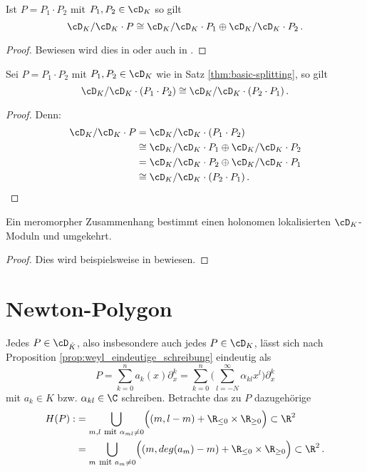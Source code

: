 \begin{thm}\label{thm:basic-splitting}
Ist $P=P_1\cdot P_2$ mit $P_1,P_2\in \cD_K$ so gilt
\[
\cD_K/\cD_K\cdot P \cong \cD_K/\cD_K\cdot P_1 \oplus \cD_K/\cD_K\cdot P_2 \,.
\]
\end{thm}
\begin{proof}
Bewiesen wird dies in
\cite[Seite 57-64]{ZulaBarbara}
oder auch in \cite[Seite 30-32]{sabbah_cimpa90}.
\end{proof}
\begin{cor} \label{cor:moduluKomutativität}
Sei $P=P_1\cdot P_2$ mit $P_1,P_2\in \cD_K$ wie in Satz
\ref{thm:basic-splitting}, so gilt
\[
\cD_K/\cD_K\cdot (P_1\cdot P_2) \cong \cD_K/\cD_K\cdot (P_2 \cdot P_1) \,.
\]
\end{cor}
\begin{comment}
TODO: verweise auf dieses Korollar
\end{comment}
\begin{proof} Denn:
\begin{align*}
\cD_K/\cD_K\cdot P &= \cD_K/\cD_K\cdot (P_1\cdot P_2)\\
  &\cong \cD_K/\cD_K\cdot P_1 \oplus \cD_K/\cD_K\cdot P_2\\
  &= \cD_K/\cD_K\cdot P_2 \oplus \cD_K/\cD_K\cdot P_1\\
  &\cong \cD_K/\cD_K\cdot (P_2 \cdot P_1) \,.
\end{align*}
\end{proof}

\begin{thm}
Ein meromorpher Zusammenhang bestimmt einen holonomen lokalisierten
$\cD_K$-Moduln und umgekehrt.
\end{thm}
\begin{proof}
Dies wird beispielsweise in \cite[Thm 4.3.2]{sabbah_cimpa90} bewiesen.
\end{proof}

\section{Newton-Polygon} \label{sec:NewtonPolygon}
Jedes $P\in \cD_{\hat K}$, also insbesondere auch jedes $P\in\cD_K$, lässt sich
nach Proposition \ref{prop:weyl_eindeutige_schreibung} eindeutig als
\[
P=\sum^{n}_{k=0}a_k(x)\partial_x^k
=\sum^{n}_{k=0}\Big(\sum^{\infty}_{l=-N}{\alpha_{kl}x^l\Big)\partial_x^k} 
\]
mit $a_k\in \hat K$ bzw. $\alpha_{kl}\in\C$ schreiben. Betrachte das zu $P$
dazugehörige
\begin{align*}
H(P):&=\underset{m,l\mbox{ \footnotesize mit }\alpha_{ml}\neq0}{\bigcup}
  \Big( (m,l-m) + \R_{\leq 0}\times \R_{\geq 0} \Big) \subset \R^2\\
  &=\underset{m\mbox{ \footnotesize mit }a_{m}\neq0}{\bigcup}
  \Big( (m,deg(a_m)-m) + \R_{\leq 0}\times \R_{\geq 0} \Big) \subset \R^2 \,.
\end{align*}

